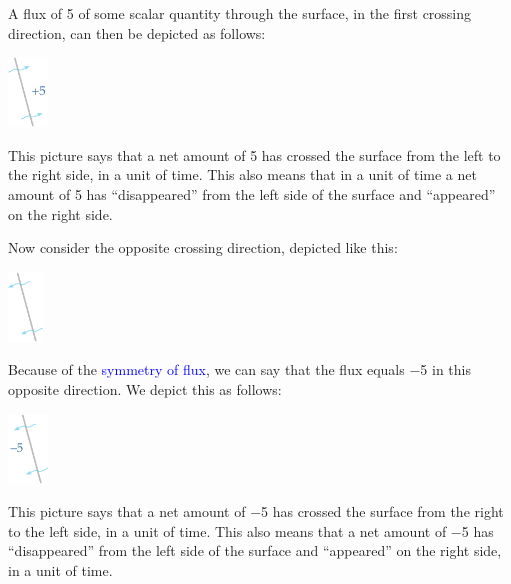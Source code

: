 \documentclass[a4paper,12pt,%
onecolumn,oneside,%
british%
]{memoir}
\renewcommand*{\|}[1][]{\nonscript\:#1\vert\nonscript\:\mathopen{}}
\newcommand*{\sect}{\S}%
\renewcommand*{\autoref}[2]{\sidepar{\vspace{-1ex}\footnotesize{\color{blue}\faIcon{%
angle-right%
}\enspace\sect~\ref{#1} page~\pageref{#1}}}\textcolor{blue}{#2}}
\begin{document}
A flux of \num{+5} of some scalar quantity through the surface, in the first crossing direction, can then be depicted as follows:\noprelistbreak
\begin{center}
  \medskip
  \includegraphics[height=5em]{images/flux_plus5c.pdf}
\end{center}
This picture says that a net amount of \num{5} has crossed the surface from the left to the right side, in a unit of time. This also means that in a unit of time a net amount of \num{5} has \enquote{disappeared} from the left side of the surface and \enquote{appeared} on the right side.

\medskip

Now consider the opposite crossing direction, depicted like this:\noprelistbreak
\begin{center}
  \medskip
  \includegraphics[height=5em]{images/surface_tilted_crossleft.pdf}
\end{center}
Because of the \autoref{def:symmetryflux}{symmetry of flux}, we can say that the flux equals \num{-5} in this opposite direction. We depict this as follows:\noprelistbreak
\begin{center}
  \medskip
  \includegraphics[height=5em]{images/flux_minus5c.pdf}
\end{center}
This picture says that a net amount of \num{-5} has crossed the surface from the right to the left side, in a unit of time. This also means that a net amount of \num{-5} has \enquote{disappeared} from the left side of the surface and \enquote{appeared} on the right side, in a unit of time.
\end{document}
